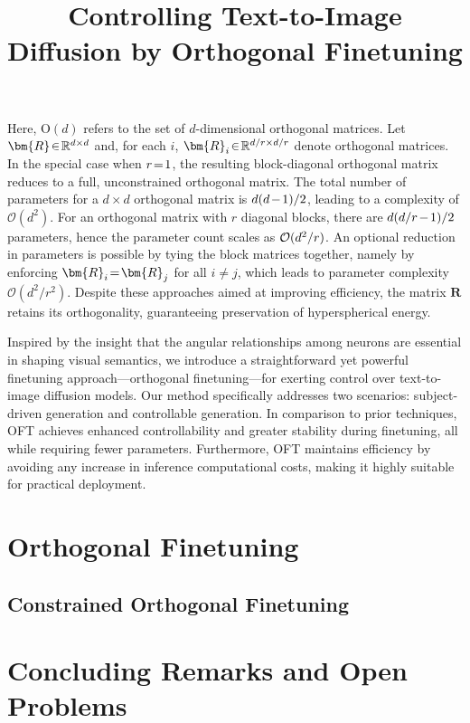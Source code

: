 \title{Controlling Text-to-Image Diffusion by Orthogonal Finetuning}
Here, $\text{O}(d)$ refers to the set of $d$-dimensional orthogonal matrices. Let $\thickmuskip=2mu \medmuskip=2mu \bm{R} \in \mathbb{R}^{d \times d}$ and, for each $i$, $\thickmuskip=2mu \medmuskip=2mu \bm{R}_i \in \mathbb{R}^{d/r \times d/r}$ denote orthogonal matrices. In the special case when $\thickmuskip=2mu \medmuskip=2mu r = 1$, the resulting block-diagonal orthogonal matrix reduces to a full, unconstrained orthogonal matrix. The total number of parameters for a $d \times d$ orthogonal matrix is $\thickmuskip=2mu \medmuskip=2mu d(d-1)/2$, leading to a complexity of $\mathcal{O}(d^2)$. For an orthogonal matrix with $r$ diagonal blocks, there are $\thickmuskip=2mu \medmuskip=2mu d(d/r-1)/2$ parameters, hence the parameter count scales as $\thickmuskip=2mu \medmuskip=2mu \mathcal{O}(d^2/r)$. An optional reduction in parameters is possible by tying the block matrices together, namely by enforcing $\thickmuskip=2mu \medmuskip=2mu\bm{R}_i = \bm{R}_j$ for all $i \neq j$, which leads to parameter complexity $\mathcal{O}(d^2/r^2)$. Despite these approaches aimed at improving efficiency, the matrix $\bm{R}$ retains its orthogonality, guaranteeing preservation of hyperspherical energy.



Inspired by the insight that the angular relationships among neurons are essential in shaping visual semantics, we introduce a straightforward yet powerful finetuning approach—orthogonal finetuning—for exerting control over text-to-image diffusion models. Our method specifically addresses two scenarios: subject-driven generation and controllable generation. In comparison to prior techniques, OFT achieves enhanced controllability and greater stability during finetuning, all while requiring fewer parameters. Furthermore, OFT maintains efficiency by avoiding any increase in inference computational costs, making it highly suitable for practical deployment.

\section{Orthogonal Finetuning}

\subsection{Constrained Orthogonal Finetuning}

\section{Concluding Remarks and Open Problems}

